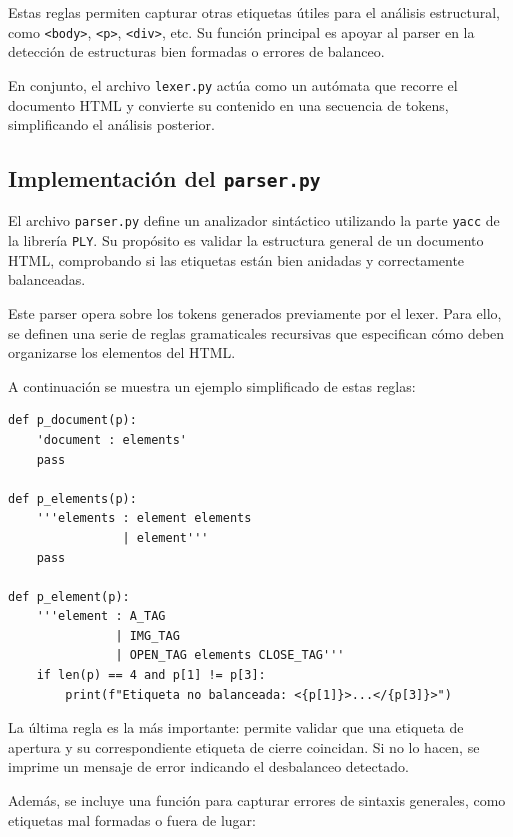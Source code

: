 \documentclass[11pt,a4paper]{article}
\begin{document}
Estas reglas permiten capturar otras etiquetas útiles para el análisis estructural, como \texttt{<body>}, \texttt{<p>}, \texttt{<div>}, etc. Su función principal es apoyar al parser en la detección de estructuras bien formadas o errores de balanceo.

\medskip

En conjunto, el archivo \texttt{lexer.py} actúa como un autómata que recorre el documento HTML y convierte su contenido en una secuencia de tokens, simplificando el análisis posterior.

\subsection{Implementación del \texttt{parser.py}}

El archivo \texttt{parser.py} define un analizador sintáctico utilizando la parte \texttt{yacc} de la librería \texttt{PLY}. Su propósito es validar la estructura general de un documento HTML, comprobando si las etiquetas están bien anidadas y correctamente balanceadas.

\medskip

Este parser opera sobre los tokens generados previamente por el lexer. Para ello, se definen una serie de reglas gramaticales recursivas que especifican cómo deben organizarse los elementos del HTML.

\medskip

A continuación se muestra un ejemplo simplificado de estas reglas:

\begin{verbatim}
def p_document(p):
    'document : elements'
    pass

def p_elements(p):
    '''elements : element elements
                | element'''
    pass

def p_element(p):
    '''element : A_TAG
               | IMG_TAG
               | OPEN_TAG elements CLOSE_TAG'''
    if len(p) == 4 and p[1] != p[3]:
        print(f"Etiqueta no balanceada: <{p[1]}>...</{p[3]}>")
\end{verbatim}

La última regla es la más importante: permite validar que una etiqueta de apertura y su correspondiente etiqueta de cierre coincidan. Si no lo hacen, se imprime un mensaje de error indicando el desbalanceo detectado.

\medskip

Además, se incluye una función para capturar errores de sintaxis generales, como etiquetas mal formadas o fuera de lugar:
\end{document}
